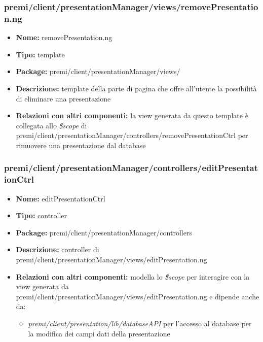 \subsubsection{premi/client/presentationManager/views/removePresentation.ng}
\begin{itemize}
  \item[] \textbf{Nome:} removePresentation.ng
  \item[] \textbf{Tipo:} template 
  \item[] \textbf{Package:} premi/client/presentationManager/views/
  \item[] \textbf{Descrizione:} template della parte di pagina che offre all'utente la possibilità di eliminare una presentazione 
  \item[] \textbf{Relazioni con altri componenti:} la view generata da questo template è collegata allo \textit{\$scope} di premi/client/presentationManager/controllers/removePresentationCtrl per rimuovere una presentazione dal database
\end{itemize}

\subsubsection{premi/client/presentationManager/controllers/editPresentationCtrl}
\begin{itemize}
  \item[] \textbf{Nome:} editPresentationCtrl
  \item[] \textbf{Tipo:} controller
  \item[] \textbf{Package:} premi/client/presentationManager/controllers
  \item[] \textbf{Descrizione:} controller di premi/client/presentationManager/views/editPresentation.ng
  \item[] \textbf{Relazioni con altri componenti:} modella lo \textit{\$scope} per interagire con la view generata da premi/client/presentationManager/views/editPresentation.ng e dipende anche da:
 \begin{itemize}
 \item \textit{premi/client/presentation/lib/databaseAPI} per l'accesso al database per la modifica dei campi dati della presentazione
 \end{itemize}
\end{itemize}

